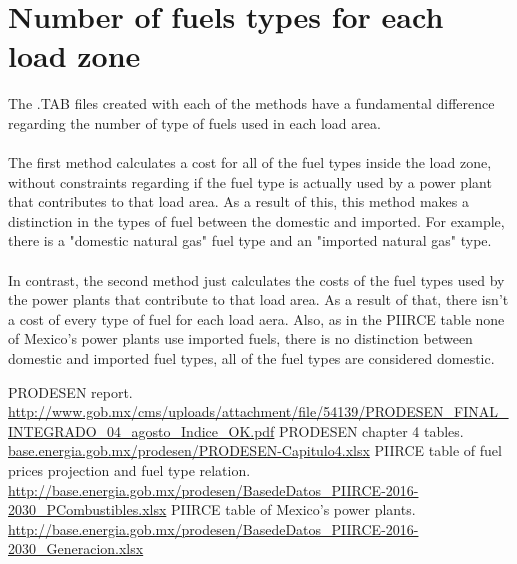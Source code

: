 \documentclass{article}
\begin{document}
\section{Number of fuels types for each load zone}
The .TAB files created with each of the methods have a fundamental difference regarding the number of type of fuels used in each load area.
\\
\\The first method calculates a cost for all of the fuel types inside the load zone, without constraints regarding if the fuel type is actually used by a power plant that contributes to that load area. As a result of this, this method makes a distinction in the types of fuel between the domestic and imported. For example, there is a "domestic natural gas" fuel type and an "imported natural gas" type.
\\
\\In contrast, the second method just calculates the costs of the fuel types used by the power plants that contribute to that load area. As a result of that, there isn't a cost of every type of fuel for each load aera. Also, as in the PIIRCE table none of Mexico's power plants use imported fuels, there is no distinction between domestic and imported fuel types, all of the fuel types are considered domestic.
\begin{thebibliography}{9}
PRODESEN report. \url{http://www.gob.mx/cms/uploads/attachment/file/54139/PRODESEN_FINAL_INTEGRADO_04_agosto_Indice_OK.pdf}
PRODESEN chapter 4 tables. \url{base.energia.gob.mx/prodesen/PRODESEN-Capitulo4.xlsx}
PIIRCE table of fuel prices projection and fuel type relation. \url{http://base.energia.gob.mx/prodesen/BasedeDatos_PIIRCE-2016-2030_PCombustibles.xlsx}
PIIRCE table of Mexico's power plants. \url{http://base.energia.gob.mx/prodesen/BasedeDatos_PIIRCE-2016-2030_Generacion.xlsx}
\end{thebibliography}
\end{document}

